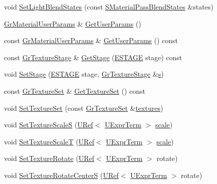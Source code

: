 \begin{CompactItemize}
\item 
void \hyperlink{class_gr_material_pass_f2cca95d15241405447e463f271c5e50}{SetLightBlendStates} (const \hyperlink{struct_s_material_pass_blend_states}{SMaterialPassBlendStates} \&states)
\item 
\hyperlink{class_gr_material_user_params}{GrMaterialUserParams} \& \hyperlink{class_gr_material_pass_7961e2a4d2fbd45128fa21cac4f32f30}{GetUserParams} ()
\item 
const \hyperlink{class_gr_material_user_params}{GrMaterialUserParams} \& \hyperlink{class_gr_material_pass_2b6f9429348c2dcf6732174f60185b3c}{GetUserParams} () const 
\item 
const \hyperlink{class_gr_texture_stage}{GrTextureStage} \& \hyperlink{class_gr_material_pass_40d16be22eb6d06342530acfdf487d87}{GetStage} (\hyperlink{_gr_config_8h_6df36e6af6bdeed00ff250f968160688}{ESTAGE} stage) const 
\item 
void \hyperlink{class_gr_material_pass_cd2c6bf8aa2bf5e5e9cb8852d1546c04}{SetStage} (\hyperlink{_gr_config_8h_6df36e6af6bdeed00ff250f968160688}{ESTAGE} stage, \hyperlink{class_gr_texture_stage}{GrTextureStage} \&\hyperlink{glext__bak_8h_d585a1393cfa368fa9dc3d8ebff640d5}{s})
\item 
const \hyperlink{class_gr_texture_set}{GrTextureSet} \& \hyperlink{class_gr_material_pass_d4fe8b412fb170dcf48688ba424c7d18}{GetTextureSet} () const 
\item 
void \hyperlink{class_gr_material_pass_ae8284d3de34bd6668950b6b1fdeabdb}{SetTextureSet} (const \hyperlink{class_gr_texture_set}{GrTextureSet} \&\hyperlink{glext__bak_8h_76454c03d9d5c83988eddfce6abb7059}{textures})
\item 
void \hyperlink{class_gr_material_pass_a1a69dfaf67a8d54d6874e345398fda4}{SetTextureScaleS} (\hyperlink{class_u_ref}{URef}$<$ \hyperlink{class_u_expr_term}{UExprTerm} $>$ \hyperlink{glext__bak_8h_281421b881aa7a1266842b73a3bc7655}{scale})
\item 
void \hyperlink{class_gr_material_pass_d3e27ebf2fdecfcb84127dc777b41f71}{SetTextureScaleT} (\hyperlink{class_u_ref}{URef}$<$ \hyperlink{class_u_expr_term}{UExprTerm} $>$ \hyperlink{glext__bak_8h_281421b881aa7a1266842b73a3bc7655}{scale})
\item 
void \hyperlink{class_gr_material_pass_a9ad26db402f4f8e52caf3feb36b4749}{SetTextureRotate} (\hyperlink{class_u_ref}{URef}$<$ \hyperlink{class_u_expr_term}{UExprTerm} $>$ rotate)
\item 
void \hyperlink{class_gr_material_pass_6132f67504d434010d20fefee1a1a512}{SetTextureRotateCenterS} (\hyperlink{class_u_ref}{URef}$<$ \hyperlink{class_u_expr_term}{UExprTerm} $>$ rotate)

\end{CompactItemize}
